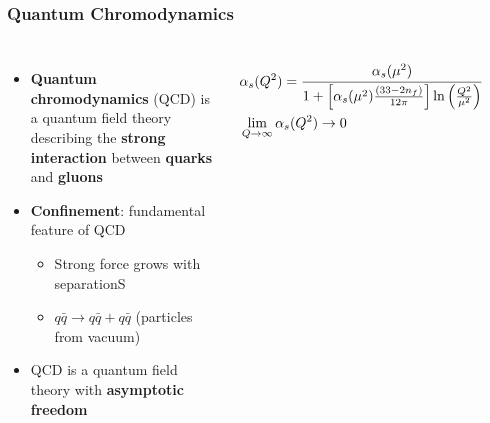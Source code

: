 \documentclass[9pt]{beamer}
\begin{document}
     \begin{frame}
       \frametitle{\textbf{Quantum Chromodynamics}}
       \begin{columns}
         \begin{itemize}
         \item \textbf{Quantum chromodynamics} (QCD) is a quantum field theory describing the \textbf{strong interaction} between \textbf{quarks} and \textbf{gluons}
         \item \textbf{Confinement}: fundamental feature of QCD
           \begin{itemize}
           \item Strong force grows with separationS
           \item $q\bar{q} \to q\bar{q} + q\bar{q}$ (particles from vacuum)
           \end{itemize}
         \item QCD is a quantum field theory with \textbf{asymptotic freedom}
         \end{itemize}
         \begin{align*}
           &\alpha_s(Q^2) = \cfrac{\alpha_s(\mu^2)}{1 + \left[\alpha_s(\mu^2)\frac{(33 - 2n_f)}{12\pi}\right]\ln\left(\frac{Q^2}{\mu^2}\right)} \\
           &\lim_{Q \to \infty}\alpha_s(Q^2) \to 0
         \end{align*}

         \centering

         \

       \end{columns}
     \end{frame}
\end{document}
